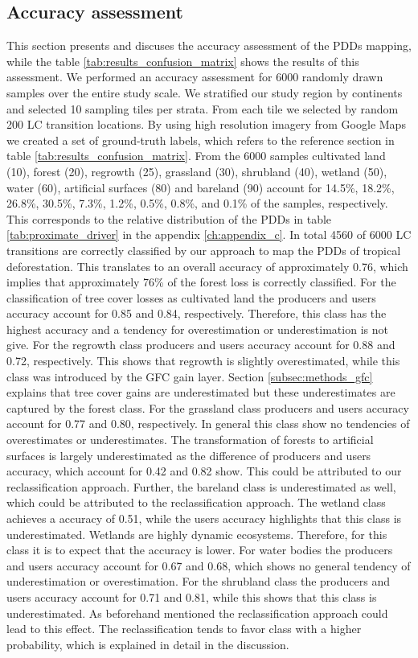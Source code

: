 		\subsection{Accuracy assessment}
		\label{subsec:results_accuracy_assessment}
			This section presents and discuses the accuracy assessment of the \acp{PDD} mapping, while the table \ref{tab:results_confusion_matrix} shows the results of this assessment. We performed an accuracy assessment for 6000 randomly drawn samples over the entire study scale. We stratified our study region by continents and selected 10 sampling tiles per strata. From each tile we selected by random 200 \ac{LC} transition locations. By using high resolution imagery from Google Maps we created a set of ground-truth labels, which refers to the reference section in table \ref{tab:results_confusion_matrix}. From the 6000 samples cultivated land (10), forest (20), regrowth (25), grassland (30), shrubland (40), wetland (50), water (60), artificial surfaces (80) and bareland (90) account for 14.5\%, 18.2\%, 26.8\%, 30.5\%, 7.3\%, 1.2\%, 0.5\%, 0.8\%, and 0.1\% of the samples, respectively. This corresponds to the relative distribution of the  \acp{PDD} in table \ref{tab:proximate_driver} in the appendix \ref{ch:appendix_c}. In total 4560 of 6000 \ac{LC} transitions are correctly classified by our approach to map the \acp{PDD} of tropical deforestation. This translates to an overall accuracy of approximately 0.76, which implies that approximately 76\% of the forest loss is correctly classified. For the classification of tree cover losses as cultivated land the producers and users accuracy account for 0.85 and 0.84, respectively. Therefore, this class has the highest accuracy and a tendency for overestimation or underestimation is not give. For the regrowth class producers and users accuracy account for 0.88 and 0.72, respectively. This shows that regrowth is slightly overestimated, while this class was introduced by the \ac{GFC} gain layer. Section \ref{subsec:methods_gfc} explains that tree cover gains are underestimated but these underestimates are captured by the forest class. For the grassland class producers and users accuracy account for 0.77 and 0.80, respectively. In general this class show no tendencies of overestimates or underestimates. The transformation of forests to artificial surfaces is largely underestimated as the difference of producers and users accuracy, which account for 0.42 and 0.82 show. This could be attributed to our reclassification approach. Further, the bareland class is underestimated as well, which could be attributed to the reclassification approach. The wetland class achieves a accuracy of 0.51, while the users accuracy highlights that this class is underestimated. Wetlands are highly dynamic ecosystems. Therefore, for this class it is to expect that the accuracy is lower. For water bodies the producers and users accuracy account for 0.67 and 0.68, which shows no general tendency of underestimation or overestimation. For the shrubland class the producers and users accuracy account for 0.71 and 0.81, while this shows that this class is underestimated. As beforehand mentioned the reclassification approach could lead to this effect. The reclassification tends to favor class with a higher probability, which is explained in detail in the discussion.
